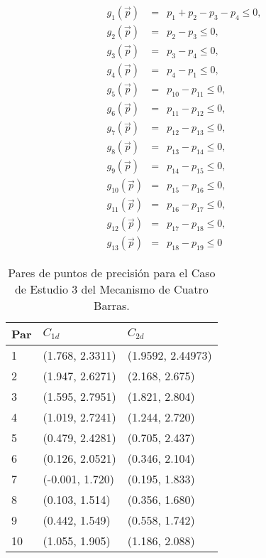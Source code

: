 \begin{eqnarray}\label{eq:Restricciones MEC1}
g_{1}(\vec{p})&=&p_{1}+ p_{2}-p_{3}-p_{4} \leq 0,\\
g_{2}(\vec{p})&=&p_{2}-p_{3} \leq 0,\\
g_{3}(\vec{p})&=&p_{3}-p_{4} \leq 0,\\
g_{4}(\vec{p})&=&p_{4}-p_{1} \leq 0,\\
g_{5}(\vec{p})&=&p_{10}-p_{11} \leq 0,\\
g_{6}(\vec{p})&=&p_{11}-p_{12} \leq 0,\\
g_{7}(\vec{p})&=&p_{12}-p_{13} \leq 0,\\
g_{8}(\vec{p})&=&p_{13}-p_{14} \leq 0,\\
g_{9}(\vec{p})&=&p_{14}-p_{15} \leq 0,\\
g_{10}(\vec{p})&=&p_{15}-p_{16} \leq 0,\\
g_{11}(\vec{p})&=&p_{16}-p_{17} \leq 0,\\
g_{12}(\vec{p})&=&p_{17}-p_{18} \leq 0,\\
g_{13}(\vec{p})&=&p_{18}-p_{19} \leq 0 \label{eq:g13_MEC3}
\end{eqnarray}
\begin{table}[]
\centering
\begin{tabular}{|l|l|l|} 
\hline
\textbf{Par}& $C_{1d}$& $C_{2d}$  \\ \hline
1&  (1.768, 2.3311) &  (1.9592, 2.44973) \\ \hline
2& (1.947, 2.6271) & (2.168, 2.675)\\ \hline
3& (1.595, 2.7951) &(1.821, 2.804)\\ \hline
4& (1.019, 2.7241) &(1.244, 2.720)\\ \hline
5 &(0.479, 2.4281) &(0.705, 2.437)\\ \hline
6 &(0.126, 2.0521) &(0.346, 2.104)\\ \hline
7 &(-0.001, 1.720) &(0.195, 1.833)\\ \hline
8 &(0.103, 1.514) &(0.356, 1.680)\\ \hline
9 &(0.442, 1.549) &(0.558, 1.742)\\ \hline
10& (1.055, 1.905)& (1.186, 2.088)\\ \hline
\end{tabular}
\caption{Pares de puntos de precisión para el Caso de Estudio 3 del Mecanismo de Cuatro Barras.}
\label{tab:Coordenadas MEC3}
\end{table}
